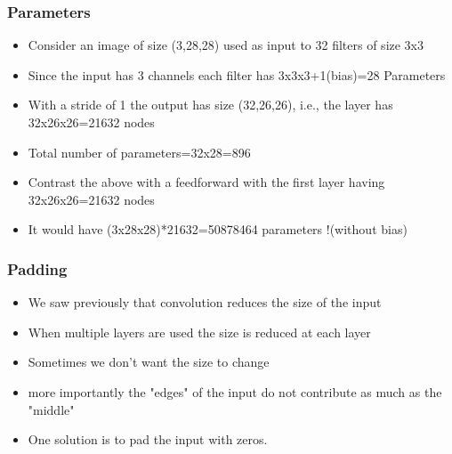 \documentclass{beamer}
\begin{document}
\begin{frame}
    \frametitle{Parameters}
    \begin{itemize}
        \item Consider an image of size (3,28,28) used as input to 32 filters of size 3x3
        \item Since the input has 3 channels each filter has 3x3x3+1(bias)=28 Parameters
        \item With a stride of 1 the output has size (32,26,26), i.e., the layer has 32x26x26=21632 nodes
        \item Total number of parameters=32x28=896
        \item Contrast the above with a feedforward with the first layer having 32x26x26=21632 nodes
        \item It would have (3x28x28)*21632=50878464 parameters !(without bias)
    \end{itemize}
    

\end{frame}
\begin{frame}
    \frametitle{Padding}
    \begin{itemize}
        \item We saw previously that convolution reduces the size of the input
        \item When multiple layers are used the size is reduced at each layer
        \item Sometimes we don't want the size to change
        \item more importantly the "edges" of the input do not contribute as much as the "middle"
        \item One solution is to pad the input with zeros.
    \end{itemize}
\end{frame}
\end{document}

